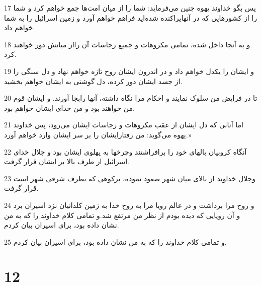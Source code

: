 \par 17 پس بگو خداوند یهوه چنین می‌فرماید: شما را از میان امت‌ها جمع خواهم کرد و شما را از کشورهایی که در آنهاپراکنده شده‌اید فراهم خواهم آورد و زمین اسرائیل را به شما خواهم داد.
\par 18 و به آنجا داخل شده، تمامی مکروهات و جمیع رجاسات آن رااز میانش دور خواهند کرد.
\par 19 و ایشان را یکدل خواهم داد و در اندرون ایشان روح تازه خواهم نهاد و دل سنگی را از جسد ایشان دور کرده، دل گوشتی به ایشان خواهم بخشید.
\par 20 تا در فرایض من سلوک نمایند و احکام مرا نگاه داشته، آنها رابجا آورند. و ایشان قوم من خواهند بود و من خدای ایشان خواهم بود.
\par 21 اما آنانی که دل ایشان از عقب مکروهات و رجاسات ایشان می‌رود، پس خداوند یهوه می‌گوید: من رفتارایشان را بر سر ایشان وارد خواهم آورد.»
\par 22 آنگاه کروبیان بالهای خود را برافراشتند وچرخها به پهلوی ایشان بود و جلال خدای اسرائیل از طرف بالا بر ایشان قرار گرفت.
\par 23 وجلال خداوند از بالای میان شهر صعود نموده، برکوهی که بطرف شرقی شهر است قرار گرفت.
\par 24 و روح مرا برداشت و در عالم رویا مرا به روح خدا به زمین کلدانیان نزد اسیران برد و آن رویایی که دیده بودم از نظر من مرتفع شد.و تمامی کلام خداوند را که به من نشان داده بود، برای اسیران بیان کردم.
\par 25 و تمامی کلام خداوند را که به من نشان داده بود، برای اسیران بیان کردم.

\chapter{12}


